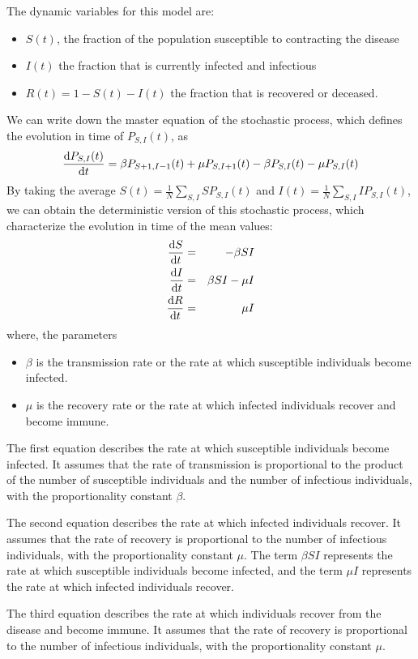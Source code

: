 The dynamic variables for this model are:
\begin{itemize}
 \item $S(t)$, the fraction of the population susceptible to contracting the disease
 \item $I(t)$ the fraction that is currently infected and infectious
 \item $R(t) = 1- S(t)  - I(t)$ the fraction that is recovered or deceased.
\end{itemize}

We can write down the master equation of the stochastic process, which defines the evolution in time of $P_{S,I}(t)$, as
\[ \frac{\mathrm{d} P_{S,I}(t)}{\mathrm{d} t}  = \beta P_{S+1,I-1}(t) + \mu P_{S,I+1}(t) -\beta P_{S,I}(t) -\mu P_{S,I}(t)\]
By taking the average $S(t)= \frac 1 N \sum_{S,I} S P_{S,I}(t)$ and $I(t)= \frac 1 N \sum_{S,I} I P_{S,I}(t)$, we can obtain the deterministic version of this stochastic process, which characterize the evolution in time of the mean values:
\begin{eqnarray}
\frac{\mathrm{d} S}{\mathrm{d} t} &=& -\beta SI  \nonumber \\
\frac{\mathrm{d} I}{\mathrm{d} t} &=& \beta SI - \mu I  \label{eq:SIR} \\
\frac{\mathrm{d} R}{\mathrm{d} t} &=& \mu I \nonumber
\end{eqnarray}
where, the parameters
\begin{itemize}
 \item $\beta$ is the transmission rate or the rate at which susceptible individuals become infected.
\item $\mu$ is the recovery rate or the rate at which infected individuals recover and become immune.
\end{itemize}

The first equation describes the rate at which susceptible individuals become infected. It assumes that the rate of transmission is proportional to the product of the number of susceptible individuals and the number of infectious individuals, with the proportionality constant $\beta$.

The second equation describes the rate at which infected individuals recover. It assumes that the rate of recovery is proportional to the number of infectious individuals, with the proportionality constant $\mu$. The term $\beta SI$ represents the rate at which susceptible individuals become infected, and the term $\mu I$ represents the rate at which infected individuals recover.

The third equation describes the rate at which individuals recover from the disease and become immune. It assumes that the rate of recovery is proportional to the number of infectious individuals, with the proportionality constant $\mu$.

